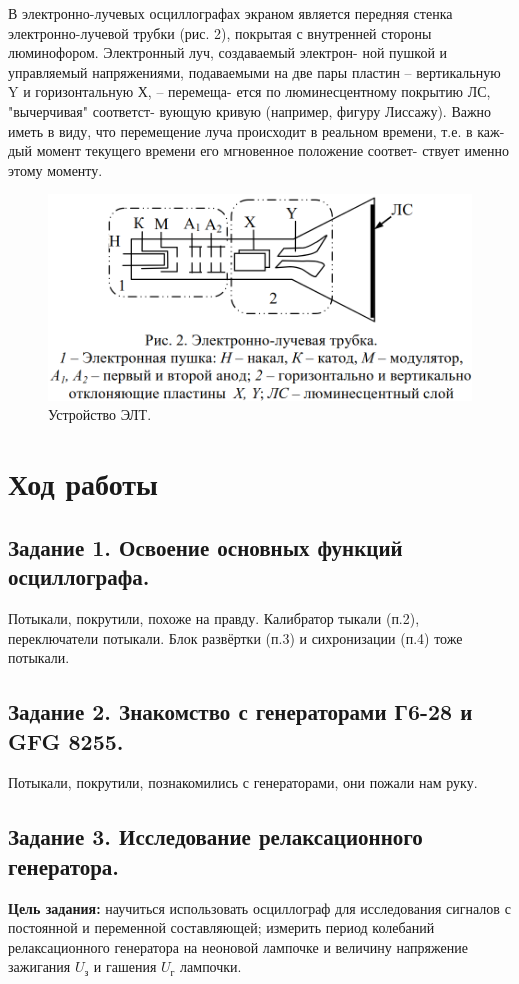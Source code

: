 \documentclass[a4paper,12pt]{article}
\begin{document}
В электронно-лучевых осциллографах экраном является передняя
стенка электронно-лучевой трубки (рис. 2), покрытая с внутренней
стороны люминофором. Электронный луч, создаваемый электрон-
ной пушкой и управляемый напряжениями, подаваемыми на две
пары пластин – вертикальную Y и горизонтальную Х, – перемеща-
ется по люминесцентному покрытию ЛС, "вычерчивая" соответст-
вующую кривую (например, фигуру Лиссажу). Важно иметь в виду,
что перемещение луча происходит в реальном времени, т.е. в каж-
дый момент текущего времени его мгновенное положение соответ-
ствует именно этому моменту.

\begin{figure}[h!]
	\begin{center}
		\includegraphics[scale=0.6]{ELT.png}
	\end{center}
	\caption{Устройство ЭЛТ.}
\end{figure}

\clearpage
\section{Ход работы}
\subsection{Задание 1. Освоение основных функций осциллографа.}
Потыкали, покрутили, похоже на правду. Калибратор тыкали (п.2), переключатели потыкали. Блок развёртки (п.3) и сихронизации (п.4) тоже потыкали.
\subsection{Задание 2. Знакомство с генераторами Г6-28 и GFG 8255.}
Потыкали, покрутили, познакомились с генераторами, они пожали нам руку.

\subsection{Задание 3. Исследование релаксационного генератора.}
\textbf{Цель задания:} научиться использовать осциллограф для исследования
сигналов с постоянной и переменной составляющей; измерить период колебаний релаксационного генератора на неоновой лампочке
и величину напряжение зажигания $U_з$ и гашения $U_г$ лампочки.
\end{document}
